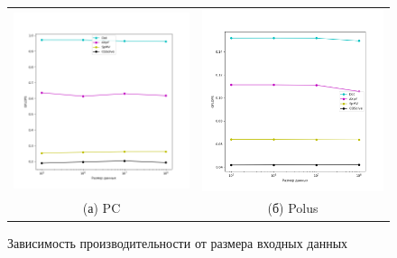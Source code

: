 \documentclass[12pt, a4paper]{article}
\begin{document}
\begin{figure}[H]
	\center
	\begin{tabular}{cc}
		\includegraphics[width=85mm]{singlethread_pc} & \includegraphics[width=85mm]{singlethread_polus} \\
		(а) PC & (б) Polus \\[6pt]
	\end{tabular}
	\caption{Зависимость производительности от размера входных данных} 
	\label{fig:singlethread_flops}
\end{figure}
\end{document}
